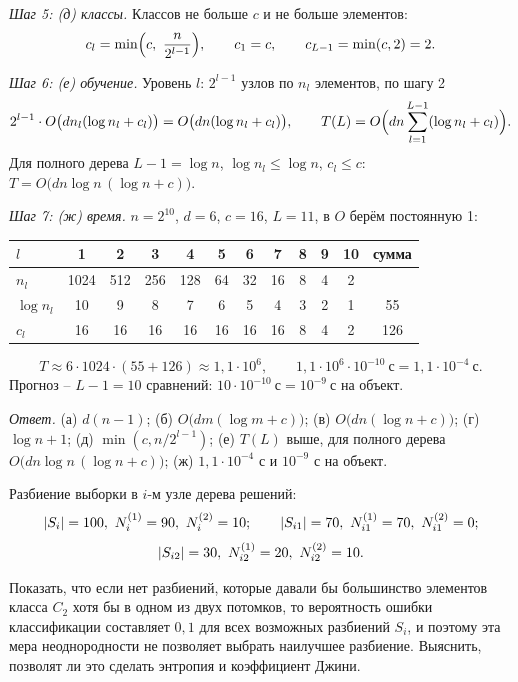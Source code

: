 \documentclass[12pt,a4paper]{article}
\begin{document}
\emph{Шаг 5: (д) классы.} Классов не больше $c$ и не больше элементов:
\[
  c_l = \min\Bigl(c,\ \frac{n}{2^{l-1}}\Bigr),
  \qquad
  c_1 = c,
  \qquad
  c_{L-1} = \min(c, 2) = 2 .
\]

\emph{Шаг 6: (е) обучение.} Уровень $l$: $2^{l-1}$ узлов по $n_l$ элементов, по шагу 2
\[
  2^{l-1} \cdot O\bigl(dn_l(\log n_l + c_l)\bigr) = O\bigl(dn(\log n_l + c_l)\bigr),
  \qquad
  T(L) = O\Bigl(dn\sum_{l=1}^{L-1}(\log n_l + c_l)\Bigr).
\]
Для полного дерева $L - 1 = \log n$, $\log n_l \le \log n$, $c_l \le c$:
$T = O\bigl(dn\log n\,(\log n + c)\bigr)$.

\emph{Шаг 7: (ж) время.} $n = 2^{10}$, $d = 6$, $c = 16$, $L = 11$, в $O$ берём
постоянную 1:
\begin{center}
\begin{tabular}{l*{10}{c}c}
\toprule
$l$ & 1 & 2 & 3 & 4 & 5 & 6 & 7 & 8 & 9 & 10 & сумма \\
\midrule
$n_l$ & 1024 & 512 & 256 & 128 & 64 & 32 & 16 & 8 & 4 & 2 & \\
$\log n_l$ & 10 & 9 & 8 & 7 & 6 & 5 & 4 & 3 & 2 & 1 & 55 \\
$c_l$ & 16 & 16 & 16 & 16 & 16 & 16 & 16 & 8 & 4 & 2 & 126 \\
\bottomrule
\end{tabular}
\end{center}
\[
  T \approx 6 \cdot 1024 \cdot (55 + 126) \approx 1{,}1 \cdot 10^{6},
  \qquad
  1{,}1 \cdot 10^{6} \cdot 10^{-10}\ \text{с} = 1{,}1 \cdot 10^{-4}\ \text{с} .
\]
Прогноз -- $L - 1 = 10$ сравнений: $10 \cdot 10^{-10}\ \text{с} = 10^{-9}\ \text{с}$
на объект.

\emph{Ответ.} (а) $d(n - 1)$; (б) $O\bigl(dm(\log m + c)\bigr)$;
(в) $O\bigl(dn(\log n + c)\bigr)$; (г) $\log n + 1$; (д) $\min(c, n/2^{l-1})$;
(е) $T(L)$ выше, для полного дерева $O\bigl(dn\log n\,(\log n + c)\bigr)$;
(ж) $1{,}1 \cdot 10^{-4}$ с и $10^{-9}$ с на объект.

\dano Разбиение выборки в $i$-м узле дерева решений:
\[
  \abs{S_i} = 100,\ N_i^{(1)} = 90,\ N_i^{(2)} = 10;
  \qquad
  \abs{S_{i1}} = 70,\ N_{i1}^{(1)} = 70,\ N_{i1}^{(2)} = 0;
\]
\[
  \abs{S_{i2}} = 30,\ N_{i2}^{(1)} = 20,\ N_{i2}^{(2)} = 10 .
\]

\treb Показать, что если нет разбиений, которые давали бы большинство элементов
класса $C_2$ хотя бы в одном из двух потомков, то вероятность ошибки
классификации составляет $0{,}1$ для всех возможных разбиений $S_i$, и поэтому эта
мера неоднородности не позволяет выбрать наилучшее разбиение. Выяснить,
позволят ли это сделать энтропия и коэффициент Джини.
\end{document}

